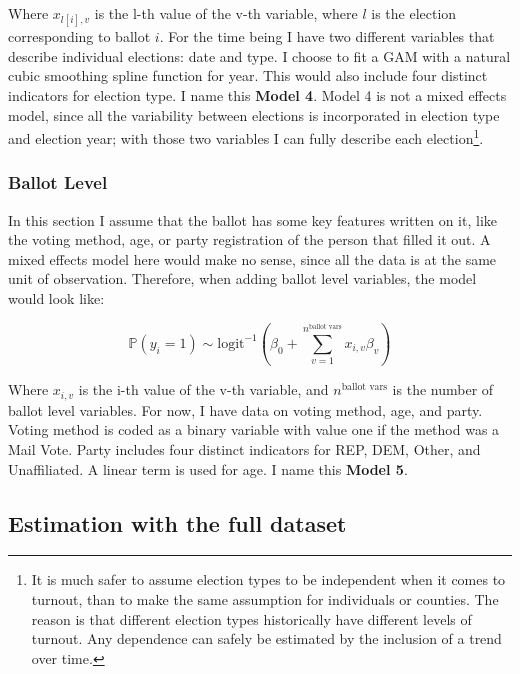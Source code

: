 \documentclass[12pt,twoside]{reedthesis}
\begin{document}
  Where \(x_{l[i], v}\) is the l-th value of the v-th variable, where
  \(l\) is the election corresponding to ballot \(i\). For the time being
  I have two different variables that describe individual elections: date
  and type. I choose to fit a GAM with a natural cubic smoothing spline
  function for year. This would also include four distinct indicators for
  election type. I name this \textbf{Model 4}. Model 4 is not a mixed
  effects model, since all the variability between elections is
  incorporated in election type and election year; with those two
  variables I can fully describe each election\footnote{It is much safer
    to assume election types to be independent when it comes to turnout,
    than to make the same assumption for individuals or counties. The
    reason is that different election types historically have different
    levels of turnout. Any dependence can safely be estimated by the
    inclusion of a trend over time.}.
  
  \subsubsection{Ballot Level}\label{ballot-level}
  
  In this section I assume that the ballot has some key features written
  on it, like the voting method, age, or party registration of the person
  that filled it out. A mixed effects model here would make no sense,
  since all the data is at the same unit of observation. Therefore, when
  adding ballot level variables, the model would look like:
  
  \begin{equation} \tag{Model 5}
  \hat{\mathbb{P}}(y_i = 1) \sim \text{logit}^{-1}(\beta_0 + \sum_{v = 1}^{n^{\text{ballot vars}}}x_{i,v}\beta_{v})
  \end{equation}
  
  Where \(x_{i,v}\) is the i-th value of the v-th variable, and
  \(n^{\text{ballot vars}}\) is the number of ballot level variables. For
  now, I have data on voting method, age, and party. Voting method is
  coded as a binary variable with value one if the method was a Mail Vote.
  Party includes four distinct indicators for REP, DEM, Other, and
  Unaffiliated. A linear term is used for age. I name this \textbf{Model
  5}.
  
  \subsection{Estimation with the full
  dataset}\label{estimation-with-the-full-dataset}
  
\end{document}
